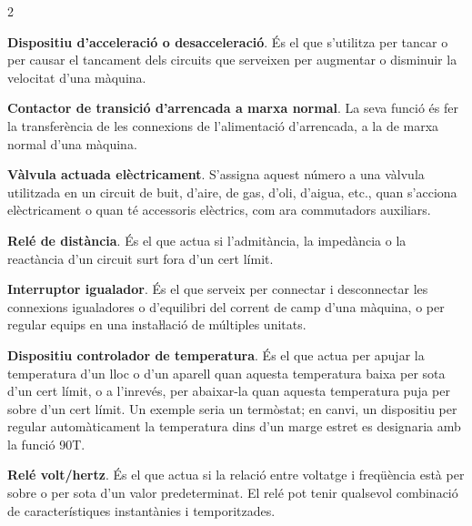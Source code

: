 \begin{multicols}{2}
\begin{list}{}
		\item[\textbf{18}]  
		\textbf{Dispositiu d'acceleració o desacceleració}. És
		el que s'utilitza per tancar o per causar el tancament dels circuits
		que serveixen per augmentar o disminuir la velocitat d'una màquina.
		
		\item[\textbf{19}]  
		\textbf{Contactor de transició d'arrencada a marxa normal}. La seva
		funció és fer la transferència de les connexions de l'alimentació
		d'arrencada, a la de marxa normal d'una màquina.
		
		\item[\textbf{20}]  
		\textbf{Vàlvula actuada elèctricament}. S'assigna aquest número a una vàlvula
		utilitzada en un circuit de buit, d'aire, de gas, d'oli, d'aigua,
		etc., quan s'acciona elèctricament o quan té accessoris elèctrics,
		com ara commutadors auxiliars.
		
		\item[\textbf{21}]   
		\textbf{Relé de distància}. És el que actua
		si l'admitància, la impedància o la reactància d'un circuit surt fora d'un cert límit.
		
		\item[\textbf{22}]   
		\textbf{Interruptor igualador}.  És el
		que serveix per connectar i desconnectar les connexions igualadores
		o d'equilibri del corrent de camp d'una màquina, o per regular
		equips en una  instaŀlació de  múltiples unitats.
		
		\item[\textbf{23}]   
		\textbf{Dispositiu controlador de temperatura}. És el que actua per apujar la
		temperatura d'un lloc o d'un aparell quan aquesta temperatura baixa
		per sota d'un cert límit, o a l'inrevés, per abaixar-la quan aquesta
		temperatura  puja per sobre d'un cert límit. Un exemple seria un
		termòstat; en canvi, un dispositiu per regular automàticament la temperatura dins
		d'un marge estret es designaria amb la funció 90T.
		
		\item[\textbf{24}]  
		\textbf{Relé volt/hertz}.
		És el que actua si la relació  entre voltatge i freqüència està per sobre o  per sota d'un valor predeterminat. El relé pot tenir qualsevol combinació de característiques instantànies i temporitzades.
		

\end{list}
\end{multicols}
